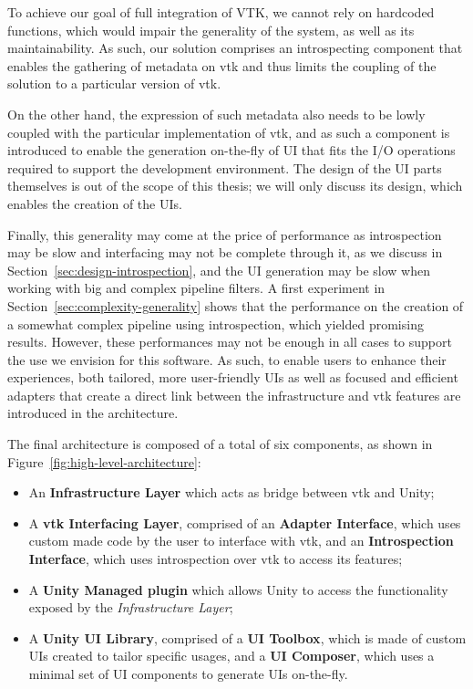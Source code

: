 To achieve our goal of full integration of VTK, we cannot rely on hardcoded functions, which would impair the generality of the system, as well as its maintainability. As such, our solution comprises an introspecting component that enables the gathering of metadata on \acrshort{vtk} and thus limits the coupling of the solution to a particular version of \acrshort{vtk}.

On the other hand, the expression of such metadata also needs to be lowly coupled with the particular implementation of \acrshort{vtk}, and as such a component is introduced to enable the generation on-the-fly of UI that fits the I/O operations required to support the development environment. The design of the UI parts themselves is out of the scope of this thesis; we will only discuss its design, which enables the creation of the UIs.

Finally, this generality may come at the price of performance as introspection may be slow and interfacing may not be complete through it, as we discuss in Section~\ref{sec:design-introspection}, and the UI generation may be slow when working with big and complex pipeline filters. A first experiment in Section~\ref{sec:complexity-generality} shows that the performance on the creation of a somewhat complex pipeline using introspection, which yielded promising results. However, these performances may not be enough in all cases to support the use we envision for this software. As such, to enable users to enhance their experiences, both  tailored, more user-friendly UIs as well as focused and efficient adapters that create a direct link between the infrastructure and \acrshort{vtk} features are introduced in the architecture.

The final architecture is composed of a total of six components, as shown in Figure~\ref{fig:high-level-architecture}:

\begin{itemize}
    \item An \textbf{Infrastructure Layer} which acts as bridge between \acrshort{vtk} and Unity;
    \item A \textbf{\acrshort{vtk} Interfacing Layer}, comprised of an \textbf{Adapter Interface}, which uses custom made code by the user to interface with \acrshort{vtk}, and an \textbf{Introspection Interface}, which uses introspection over \acrshort{vtk} to access its features;
    \item A \textbf{Unity Managed plugin} which allows Unity to access the functionality exposed by the \textit{Infrastructure Layer};
    \item A \textbf{Unity UI Library}, comprised of a \textbf{UI Toolbox}, which is made of custom UIs created to tailor specific usages, and a \textbf{UI Composer}, which uses a minimal set of UI components to generate UIs on-the-fly.
\end{itemize}

